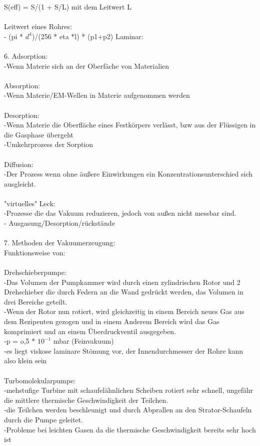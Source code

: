 			S(eff) = S/(1 + S/L) mit dem Leitwert L\\
\\
	   Leitwert eines Rohres:\\
		- (pi * $d^4$)/(256 * eta *l) * (p1+p2) Laminar:\\
\\
	6. Adsorption:\\
		-Wenn Materie sich an der Oberfäche von Materialien \\ 
\\
	   Absorption:\\
		-Wenn Materie/EM-Wellen in Materie aufgenommen werden\\
\\
	   Desorption:\\
		-Wenn Materie die Oberfläche eines Festkörpers verlässt, bzw aus der Flüssigen in die Gasphase übergeht\\
		-Umkehrprozess der Sorption\\
\\
	   Diffusion:\\
		-Der Prozess wenn ohne äußere Einwirkungen ein Konzentrationsunterschied sich ausgleicht.\\
		\\
	   "virtuelles" Leck:\\
	   	-Prozesse die das Vakuum reduzieren, jedoch von außen nicht messbar sind.\\
		- Ausgasung/Desorption/rückstände\\
\\
	7. Methoden der Vakuumerzeugung:\\
		Funktionsweise von:\\
\\
		Drehschieberpumpe:\\
			-Das Volumen der Pumpkammer wird durch einen zylindrischen Rotor und 2 Drehschieber die durch Federn an die Wand gedrückt werden, das Volumen in drei Bereiche geteilt. \\
			-Wenn der Rotor nun rotiert, wird gleichzeitig in einem Bereich neues Gas aus dem Rezipenten gezogen und in einem Anderem Bereich wird das Gas komprimiert und an einem Überdruckventil ausgegeben.\\
			-p = o,5 * $10^{-1}$ mbar (Feinvakuum)\\
			-es liegt viskose laminare Stömung vor, der Innendurchmesser der Rohre kann also klein sein\\
			\\
		Turbomolekularpumpe:\\
			-mehstufige Turbine mit schaufelähnlichen Scheiben rotiert sehr schnell, ungefähr die mittlere thermische Geschwindigkeit der Teilchen.\\
			-die Teilchen werden beschleunigt und durch Abprallen an den Strator-Schaufeln durch die Pumpe geleitet.\\
			-Probleme bei leichten Gasen da die thermische Geschwindigkeit bereits sehr hoch ist\\

